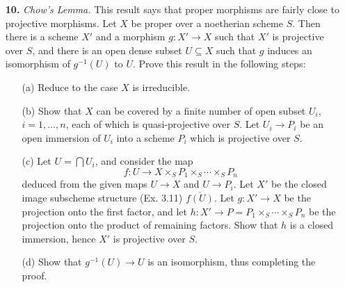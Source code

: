 \documentclass{article}
\newcommand{\Z}{\mathbf{Z}}
\newcommand{\PP}{\mathbf{P}}
\DeclareMathOperator{\spec}{Spec}
\begin{document}
\begin{enumerate} [label=\textbf{\arabic*.}, leftmargin=0em]
\begin{proof}
    By the results of (Ex. 3.13), (4.6), and (4.8), it suffices to show if $f : X \to \PP^r$ is a projective morphism, then $X$ is projective over $\spec{\Z}$. If $f$ is projective, then there exists a closed embedding $i : X \to \PP^r \times \PP^s$ such that $f$ factors through $\PP^r \to \PP^s$. The Segre embedding (\S 1, 2.14) $\psi : \PP^r \times \PP^s \to \PP^{rs + r + s}$ is a closed embedding, so $\psi \circ i : X \to \PP^{rs + r + s}$ is a closed embedding such that $X \to \spec{\Z}$ factors through $\PP^{rs + r + s} \to \spec{\Z}$, which is what we wanted to show.
\end{proof}

\item[\textbf{10.}] \textit{Chow's Lemma.} This result says that proper morphisms are fairly close to projective morphisms. Let $X$ be proper over a noetherian scheme $S$. Then there is a scheme $X'$ and a morphism $g : X' \to X$ such that $X'$ is projective over $S$, and there is an open dense subset $U \subseteq X$ such that $g$ induces an isomorphism of $g^{-1}(U)$ to $U$. Prove this result in the following steps:
\begin{itemize}
    \item[(a)] Reduce to the case $X$ is irreducible.
    \item[(b)] Show that $X$ can be covered by a finite number of open subset $U_i$, $i = 1, \dots, n$, each of which is quasi-projective over $S$. Let $U_i \to P_i$ be an open immersion of $U_i$ into a scheme $P_i$ which is projective over $S$.
    \item[(c)] Let $U = \bigcap U_i$, and consider the map
    \begin{equation*}
        f : U \to X \times_S P_1 \times_S \cdots \times_S P_n
    \end{equation*}
    deduced from the given maps $U \to X$ and $U \to P_i$. Let $X'$ be the closed image subscheme structure (Ex. 3.11) $\overline{f(U)}$. Let $g : X' \to X$ be the projection onto the first factor, and let $h : X' \to P = P_1 \times_S \cdots \times_S P_n$ be the projection onto the product of remaining factors. Show that $h$ is a closed immersion, hence $X'$ is projective over $S$.
    \item[(d)] Show that $g^{-1}(U) \to U$ is an isomorphism, thus completing the proof.
\end{itemize}

\end{enumerate}
\end{document}
